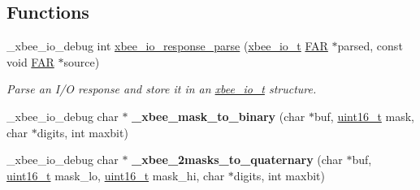 \subsection*{Functions}
\begin{DoxyCompactItemize}
\item 
\-\_\-xbee\-\_\-io\-\_\-debug int \hyperlink{group__xbee__io_ga49aae35ec2a46306bf2ad593cecbcf26}{xbee\-\_\-io\-\_\-response\-\_\-parse} (\hyperlink{structxbee__io__t}{xbee\-\_\-io\-\_\-t} \hyperlink{group__hal_gaef060b3456fdcc093a7210a762d5f2ed}{F\-A\-R} $\ast$parsed, const void \hyperlink{group__hal_gaef060b3456fdcc093a7210a762d5f2ed}{F\-A\-R} $\ast$source)
\begin{DoxyCompactList}\small\item\em Parse an I/\-O response and store it in an \hyperlink{structxbee__io__t}{xbee\-\_\-io\-\_\-t} structure. \end{DoxyCompactList}\item 
\hypertarget{group__xbee__io_ga973f925aa6983ad40f5e4fb2665d7e37}{\-\_\-xbee\-\_\-io\-\_\-debug char $\ast$ {\bfseries \-\_\-xbee\-\_\-mask\-\_\-to\-\_\-binary} (char $\ast$buf, \hyperlink{group__hal_ga5a8b2dc9e45a9ee81a94ef304fb62505}{uint16\-\_\-t} mask, char $\ast$digits, int maxbit)}\label{group__xbee__io_ga973f925aa6983ad40f5e4fb2665d7e37}

\item 
\hypertarget{group__xbee__io_ga4d913c1fcbb1a2552babe3e6a86c22c7}{\-\_\-xbee\-\_\-io\-\_\-debug char $\ast$ {\bfseries \-\_\-xbee\-\_\-2masks\-\_\-to\-\_\-quaternary} (char $\ast$buf, \hyperlink{group__hal_ga5a8b2dc9e45a9ee81a94ef304fb62505}{uint16\-\_\-t} mask\-\_\-lo, \hyperlink{group__hal_ga5a8b2dc9e45a9ee81a94ef304fb62505}{uint16\-\_\-t} mask\-\_\-hi, char $\ast$digits, int maxbit)}\label{group__xbee__io_ga4d913c1fcbb1a2552babe3e6a86c22c7}


\end{DoxyCompactItemize}
